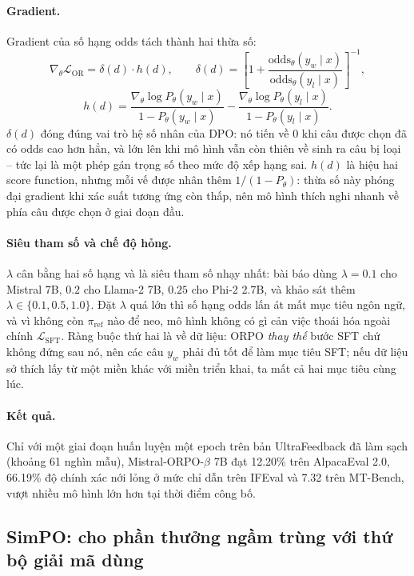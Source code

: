 \paragraph{Gradient.} Gradient của số hạng odds tách thành hai thừa số:
\[
    \nabla_\theta \mathcal{L}_{\text{OR}} = \delta(d) \cdot h(d),
    \qquad
    \delta(d) = \left[ 1 + \frac{\text{odds}_\theta(y_w \mid x)}{\text{odds}_\theta(y_l \mid x)} \right]^{-1},
\]
\[
    h(d) = \frac{\nabla_\theta \log P_\theta(y_w \mid x)}{1 - P_\theta(y_w \mid x)}
         - \frac{\nabla_\theta \log P_\theta(y_l \mid x)}{1 - P_\theta(y_l \mid x)} .
\]
\( \delta(d) \) đóng đúng vai trò hệ số nhân của DPO: nó tiến về 0 khi câu được chọn đã có odds cao hơn hẳn, và lớn lên khi mô hình vẫn còn thiên về sinh ra câu bị loại -- tức lại là một phép gán trọng số theo mức độ xếp hạng sai. \( h(d) \) là hiệu hai score function, nhưng mỗi vế được nhân thêm \( 1/(1-P_\theta) \): thừa số này phóng đại gradient khi xác suất tương ứng còn thấp, nên mô hình thích nghi nhanh về phía câu được chọn ở giai đoạn đầu.

\paragraph{Siêu tham số và chế độ hỏng.} \( \lambda \) cân bằng hai số hạng và là siêu tham số nhạy nhất: bài báo dùng \( \lambda = 0.1 \) cho Mistral 7B, \( 0.2 \) cho Llama-2 7B, \( 0.25 \) cho Phi-2 2.7B, và khảo sát thêm \( \lambda \in \{0.1, 0.5, 1.0\} \). Đặt \( \lambda \) quá lớn thì số hạng odds lấn át mất mục tiêu ngôn ngữ, và vì không còn \( \pi_{\text{ref}} \) nào để neo, mô hình không có gì cản việc thoái hóa ngoài chính \( \mathcal{L}_{\text{SFT}} \). Ràng buộc thứ hai là về dữ liệu: ORPO \emph{thay thế} bước SFT chứ không đứng sau nó, nên các câu \( y_w \) phải đủ tốt để làm mục tiêu SFT; nếu dữ liệu sở thích lấy từ một miền khác với miền triển khai, ta mất cả hai mục tiêu cùng lúc.

\paragraph{Kết quả.} Chỉ với một giai đoạn huấn luyện một epoch trên bản UltraFeedback đã làm sạch (khoảng 61 nghìn mẫu), Mistral-ORPO-\( \beta \) 7B đạt 12.20\% trên AlpacaEval 2.0, 66.19\% độ chính xác nới lỏng ở mức chỉ dẫn trên IFEval và 7.32 trên MT-Bench, vượt nhiều mô hình lớn hơn tại thời điểm công bố.

\subsection{SimPO: cho phần thưởng ngầm trùng với thứ bộ giải mã dùng}
\label{ssec:simpo}

